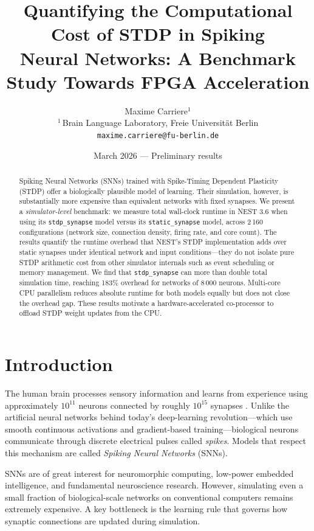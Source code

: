 \documentclass[10pt,twocolumn]{article}
\title{%
  \textbf{Quantifying the Computational Cost of STDP in Spiking\\
  Neural Networks: A Benchmark Study Towards FPGA Acceleration}
}
\author{%
  Maxime Carriere$^{1}$\\
  \small $^{1}$\,Brain Language Laboratory, Freie Universit\"{a}t Berlin\\
  \small \texttt{maxime.carriere@fu-berlin.de}
}
\date{\small March 2026 --- Preliminary results}
\begin{document}
\maketitle
\thispagestyle{empty}

\begin{abstract}
Spiking Neural Networks (SNNs) trained with Spike-Timing Dependent
Plasticity (STDP) offer a biologically plausible model of learning.
Their simulation, however, is substantially more expensive than
equivalent networks with fixed synapses.
We present a \emph{simulator-level} benchmark: we measure total
wall-clock runtime in NEST 3.6 when using its \texttt{stdp\_synapse}
model versus its \texttt{static\_synapse} model, across 2\,160
configurations (network size, connection density, firing rate, and
core count).
The results quantify the runtime overhead that NEST's STDP
implementation adds over static synapses under identical network
and input conditions---they do not isolate pure STDP arithmetic cost
from other simulator internals such as event scheduling or memory
management.
We find that \texttt{stdp\_synapse} can more than double total
simulation time, reaching 183\% overhead for networks of 8\,000
neurons.
Multi-core CPU parallelism reduces absolute runtime for both models
equally but does not close the overhead gap.
These results motivate a hardware-accelerated co-processor to
offload STDP weight updates from the CPU.
\end{abstract}

\section{Introduction}
\label{sec:intro}

The human brain processes sensory information and learns from
experience using approximately $10^{11}$ neurons connected by
roughly $10^{15}$ synapses \cite{azevedo2009}.
Unlike the artificial neural networks behind today's deep-learning
revolution---which use smooth continuous activations and
gradient-based training—biological neurons communicate through
discrete electrical pulses called \emph{spikes}.
Models that respect this mechanism are called \emph{Spiking Neural
Networks} (SNNs).

SNNs are of great interest for neuromorphic computing, low-power
embedded intelligence, and fundamental neuroscience research.
However, simulating even a small fraction of biological-scale
networks on conventional computers remains extremely expensive.
A key bottleneck is the learning rule that governs how synaptic
connections are updated during simulation.
\end{document}
